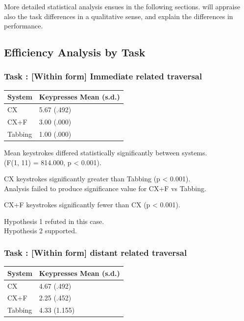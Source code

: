 \documentclass[a4paper, 12pt]{report}
\begin{document}
More detailed statistical analysis ensues in the following sections.  will appraise also the task differences in a qualitative sense, and explain the differences in performance.

\subsection{Efficiency Analysis by Task}
\newcommand{\navtask}[1]{ \subsubsection{Task : #1}}
\navtask{[Within form] Immediate related traversal}
\begin{tabular}{l l}
\hline\hline %
System & Keypresses Mean (s.d.) \\ [0.5ex] %
\hline %
CX & 5.67 (.492)\\
CX+F & 3.00 (.000)\\
Tabbing & 1.00 (.000)\\ [1ex] %
\hline %
\end{tabular}

Mean keystrokes differed statistically significantly between systems.\\
(F(1, 11) = 814.000, p < 0.001).

CX keystrokes significantly greater than Tabbing (p < 0.001).\\
Analysis failed to produce significance value for CX+F vs Tabbing.

CX+F keystrokes significantly fewer than CX (p < 0.001).

Hypothesis 1 refuted in this case.\\
Hypothesis 2 supported.

\navtask{[Within form] distant related traversal}
\begin{tabular}{l l}
\hline\hline %
System & Keypresses Mean (s.d.) \\ [0.5ex] %
\hline %
CX & 4.67 (.492)\\
CX+F & 2.25 (.452)\\
Tabbing & 4.33 (1.155)\\ [1ex] %
\hline %
\end{tabular}
\end{document}
